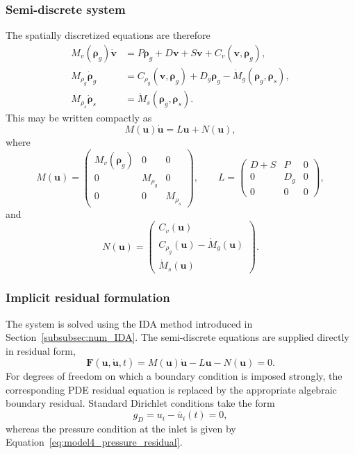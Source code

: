 \subsubsection{Semi-discrete system}

The spatially discretized equations are therefore
\begin{subequations}\label{eq:model4_semidis}
\begin{align}
M_v(\boldsymbol\rho_g)\dot{\mathbf v} &= P\boldsymbol\rho_g+D\mathbf v+S\mathbf v+C_v(\mathbf v,\boldsymbol\rho_g),\\
M_{\rho_g}\dot{\boldsymbol\rho}_g &= C_{\rho_g}(\mathbf v,\boldsymbol\rho_g)+D_g\boldsymbol\rho_g-\dot{M}_g(\boldsymbol\rho_g,\boldsymbol\rho_s),\\
M_{\rho_s}\dot{\boldsymbol\rho}_s &= \dot{M}_s(\boldsymbol\rho_g,\boldsymbol\rho_s).
\end{align}
\end{subequations}
This may be written compactly as
\begin{equation}\label{eq:model_4_semi_discrete}
M(\mathbf u)\dot{\mathbf u}=L\mathbf u+N(\mathbf u),
\end{equation}
where
\begin{equation}
M(\mathbf u)=
\begin{pmatrix}
M_v(\boldsymbol\rho_g)&0&0\\
0&M_{\rho_g}&0\\
0&0&M_{\rho_s}
\end{pmatrix},
\qquad
L=
\begin{pmatrix}
D+S&P&0\\
0&D_g&0\\
0&0&0
\end{pmatrix},
\end{equation}
and
\begin{equation}
N(\mathbf u)=
\begin{pmatrix}
C_v(\mathbf u)\\
C_{\rho_g}(\mathbf u)-\dot{M}_g(\mathbf u)\\
\dot{M}_s(\mathbf u)
\end{pmatrix}.
\end{equation}

\subsubsection{Implicit residual formulation}

The system is solved using the IDA method introduced in Section~\ref{subsubsec:num_IDA}. The semi-discrete equations are supplied directly in residual form,
\begin{equation}\label{eq:model4_residual}
\mathbf F(\mathbf u,\dot{\mathbf u},t)=M(\mathbf u)\dot{\mathbf u}-L\mathbf u-N(\mathbf u)=0.
\end{equation}
For degrees of freedom on which a boundary condition is imposed strongly, the corresponding PDE residual equation is replaced by the appropriate algebraic boundary residual. Standard Dirichlet conditions take the form
\begin{equation}
g_D=u_i-\bar u_i(t)=0,
\end{equation}
whereas the pressure condition at the inlet is given by Equation~\eqref{eq:model4_pressure_residual}.

